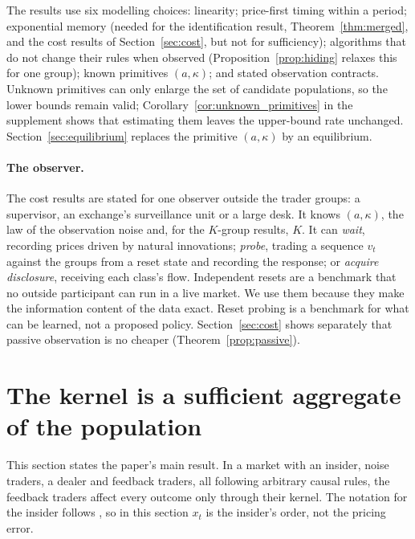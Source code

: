 \documentclass[12pt]{article}
\theoremstyle{definition}
\theoremstyle{remark}
\begin{document}
The results use six modelling choices: linearity; price-first timing within a period; exponential memory (needed for the identification result, Theorem~\ref{thm:merged}, and the cost results of Section~\ref{sec:cost}, but not for sufficiency); algorithms that do not change their rules when observed (Proposition~\ref{prop:hiding} relaxes this for one group); known primitives $(a,\kappa)$; and stated observation contracts. Unknown primitives can only enlarge the set of candidate populations, so the lower bounds remain valid; Corollary~\ref{cor:unknown_primitives} in the supplement shows that estimating them leaves the upper-bound rate unchanged. Section~\ref{sec:equilibrium} replaces the primitive $(a,\kappa)$ by an equilibrium.

\paragraph{The observer.} The cost results are stated for one observer outside the trader groups: a supervisor, an exchange's surveillance unit or a large desk. It knows $(a,\kappa)$, the law of the observation noise and, for the $K$-group results, $K$. It can \emph{wait}, recording prices driven by natural innovations; \emph{probe}, trading a sequence $v_t$ against the groups from a reset state and recording the response; or \emph{acquire disclosure}, receiving each class's flow. Independent resets are a benchmark that no outside participant can run in a live market. We use them because they make the information content of the data exact. Reset probing is a benchmark for what can be learned, not a proposed policy. Section~\ref{sec:cost} shows separately that passive observation is no cheaper (Theorem~\ref{prop:passive}).

\section{The kernel is a sufficient aggregate of the population}\label{sec:suff}

This section states the paper's main result. In a market with an insider, noise traders, a dealer and feedback traders, all following arbitrary causal rules, the feedback traders affect every outcome only through their kernel. The notation for the insider follows \citet{kyle1985}, so in this section $x_t$ is the insider's order, not the pricing error.
\end{document}

